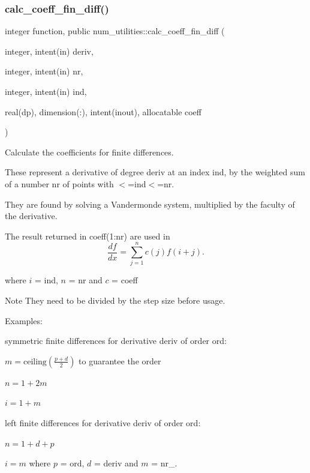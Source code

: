 \subsubsection{\texorpdfstring{calc\+\_\+coeff\+\_\+fin\+\_\+diff()}{calc\_coeff\_fin\_diff()}}
{\footnotesize\ttfamily integer function, public num\+\_\+utilities\+::calc\+\_\+coeff\+\_\+fin\+\_\+diff (\begin{DoxyParamCaption}\item[{integer, intent(in)}]{deriv,  }\item[{integer, intent(in)}]{nr,  }\item[{integer, intent(in)}]{ind,  }\item[{real(dp), dimension(\+:), intent(inout), allocatable}]{coeff }\end{DoxyParamCaption})}



Calculate the coefficients for finite differences. 

These represent a derivative of degree {\ttfamily deriv} at an index {\ttfamily ind}, by the weighted sum of a number {\ttfamily nr} of points with {$<$=ind$<$=nr}.

They are found by solving a Vandermonde system, multiplied by the faculty of the derivative.

The result returned in {\ttfamily coeff(1\+:nr)} are used in \[\frac{d f}{d x} = \sum_{j=1}^n c(j) f(i+j) . \]

where $i$ = {\ttfamily ind}, $n$ = {\ttfamily nr} and $c$ = {\ttfamily coeff} 

\begin{DoxyNote}{Note}
They need to be divided by the step size before usage.
\end{DoxyNote}
Examples\+:
\begin{DoxyItemize}
\item symmetric finite differences for derivative {\ttfamily deriv} of order {\ttfamily ord\+:} 
\begin{DoxyItemize}
\item $m = \text{ceiling}(\frac{p+d}{2})$ to guarantee the order
\item $n = 1+2m$
\item $i = 1+m$
\end{DoxyItemize}
\item left finite differences for derivative {\ttfamily deriv} of order {\ttfamily ord\+:} 
\begin{DoxyItemize}
\item $n = 1+d+p $
\item $i = m$ where $p$ = {\ttfamily ord}, $d$ = {\ttfamily deriv} and $m$ = {\ttfamily nr\+\_}.
\end{DoxyItemize}
\end{DoxyItemize}

